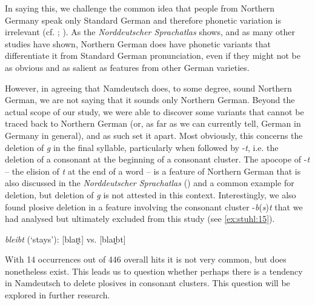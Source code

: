 \documentclass[output=paper]{langsci/langscibook}
\begin{document}
In saying this, we challenge the common idea that people from Northern Germany speak only Standard German and therefore phonetic variation is irrelevant (cf. \citealt[128]{nockler_sprachmischung_1963}; \citealt[464]{putz_sudwesterdeutsch_1991}). As the \textit{Norddeutscher Sprachatlas} shows, and as many other studies have shown, Northern German does have phonetic variants that differentiate it from Standard German pronunciation, even if they might not be as obvious and as salient as features from other German varieties. 

However, in agreeing that Namdeutsch does, to some degree, sound Northern German, we are not saying that it sounds only Northern German. Beyond the actual scope of our study, we were able to discover some variants that cannot be traced back to Northern German (or, as far as we can currently tell, German in Germany in general), and as such set it apart. Most obviously, this concerns the deletion of \textit{g} in the final syllable, particularly when followed by -\textit{t}, i.e. the deletion of a consonant at the beginning of a consonant cluster. The apocope of -\textit{t} – the elision of \textit{t} at the end of a word – is a feature of Northern German that is also discussed in the \textit{Norddeutscher Sprachatlas} (\citealt[275]{elmentaler_norddeutscher_2015}) and a common example for deletion, but deletion of \textit{g} is not attested in this context. Interestingly, we also found plosive deletion in a feature involving the consonant cluster -\textit{b}(\textit{s})\textit{t} that we had analysed but ultimately excluded from this study (see \ref{ex:stuhl:15}). 

 
\ea
\label{ex:stuhl:15}
\textit{bleibt} (‘stays’): {[blaɪ̯⁠t]} vs. {[blaɪ̯b⁠t]}
\z
 
 
With 14 occurrences out of 446 overall hits it is not very common, but does nonetheless exist. This leads us to question whether perhaps there is a tendency in Namdeutsch to delete plosives in consonant clusters. This question will be explored in further research.
\end{document}
